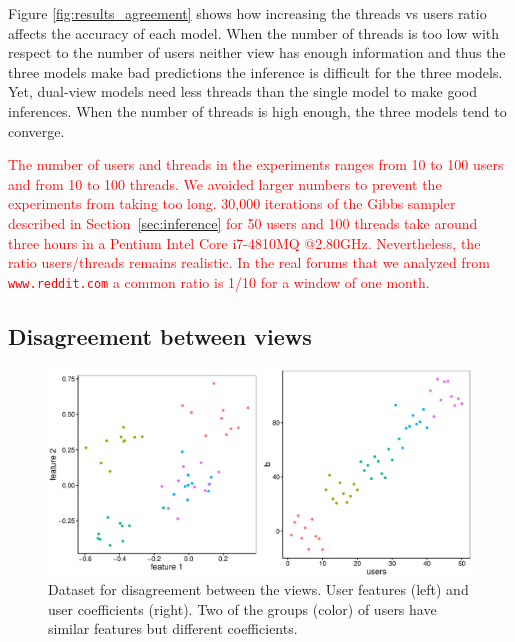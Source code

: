 \documentclass[smallextended]{svjour3}          %
\newcommand\alberto[1]{\textcolor{red}{#1}}
\begin{document}
Figure \ref{fig:results_agreement} shows how increasing the threads vs users ratio affects the accuracy of each model. When the number of threads is too low with respect to the number of users neither view has enough information and thus the three models make bad predictions the inference is difficult for the three models. Yet, dual-view models need less threads than the single model to make good inferences. When the number of threads is high enough, the three models tend to converge.

\alberto{The number of users and threads in the experiments ranges from 10 to 100 users and from 10 to 100 threads. We avoided larger numbers to prevent the experiments from taking too long. 30,000 iterations of the Gibbs sampler described in Section~\ref{sec:inference} for 50 users and 100 threads take around three hours in a Pentium Intel Core i7-4810MQ @2.80GHz. Nevertheless, the ratio users/threads remains realistic. In the real forums that we analyzed from \texttt{www.reddit.com} a common ratio is 1/10 for a window of one month.}
\subsection{Disagreement between views}

\begin{figure}
	\centering
	\includegraphics[width=1\textwidth]{Fig4_data_disagreement}
	\caption{Dataset for disagreement between the views. User features (left) and user coefficients (right). Two of the groups (color) of users have similar features but different coefficients.}
	\label{fig:data_disagreement}
\end{figure}
\end{document}
